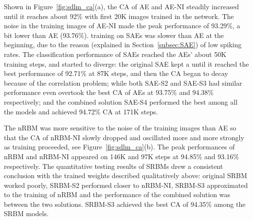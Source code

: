 Shown in Figure~\ref{fig:sdlm_ca}(a), the CA of AE and AE-NI steadily increased until it reaches about 92\% with \DIFaddbegin {}\DIFaddend first 20K images trained in the network.
The noise in the training images of AE-NI made the peak performance of 93.29\%, a bit lower than AE (93.76\%).
\DIFdelbegin {}\DIFdelend \DIFaddbegin {}\DIFaddend training on SAEs was slower than \DIFaddbegin {}\DIFaddend AE at the beginning, due to the reason (explained in Section~\ref{subsec:SAE}) of low spiking rates.
The classification performance of SAEs reached the AEs' \DIFaddbegin {}\DIFaddend about 50K training steps, and started to diverge:
the original SAE kept a \DIFdelbegin {}\DIFdelend \DIFaddbegin {}\DIFaddend until it reached the best performance of 92.71\% at 87K steps, and then the CA began to decay because of the correlation problem;
while both SAE-S2 and SAE-S3 had similar performance \DIFdelbegin {}\DIFdelend \DIFaddbegin {}\DIFaddend even overtook the best CA of AEs at 93.75\% and 94.38\% respectively;
and the combined solution SAE-S4 performed the best among all the models and achieved 94.72\% CA at 171K steps.

The nRBM was more sensitive to the noise of the training images than AE so that the CA of nRBM-NI slowly dropped and oscillated more and more strongly as training proceeded, see Figure~\ref{fig:sdlm_ca}(b).
The peak performances of nRBM and nRBM-NI appeared on 146K and 97K steps at 94.85\% and 93.16\% respectively. 
The quantitative testing results of SRBMs drew a consistent conclusion with the trained weights described qualitatively above: \DIFaddbegin {}\DIFaddend original SRBM worked poorly, SRBM-S2 performed closer to nRBM-NI, SRBM-S3 approximated to the training of nRBM and the performance of the combined solution was between the two solutions.
SRBM-S3 achieved the best CA of 94.35\% among the SRBM models.

